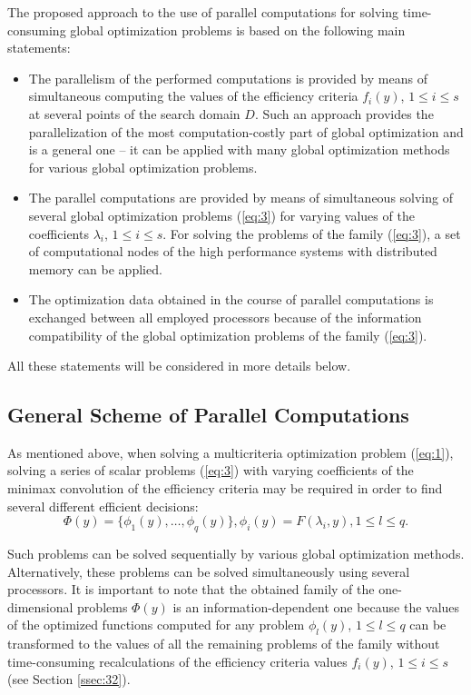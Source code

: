 \documentclass[runningheads]{llncs}
\begin{document}
The proposed approach to the use of parallel computations for solving time-consuming global optimization problems is based on the following main statements:
\begin{itemize}

\item The parallelism of the performed computations is provided by means of simultaneous computing the values of the efficiency criteria $f_i (y)$, $1 \leq i \leq s$ at several points of the search domain $D$. Such an approach provides the parallelization of the most computation-costly part of global optimization and is a general one -- it can be applied with many global optimization methods for various global optimization problems.

\item The parallel computations are provided by means of simultaneous solving of several global optimization problems (\ref{eq:3}) for varying values of the coefficients $\lambda_i$, $1 \leq i \leq s$. For solving the problems of the family (\ref{eq:3}), a set of computational nodes of the high performance systems with distributed memory can be applied.

\item The optimization data obtained in the course of parallel computations is exchanged between all employed processors because of the information compatibility of the global optimization problems of the family (\ref{eq:3}).
\end{itemize}

All these statements will be considered in more details below.


\subsection{General Scheme of Parallel Computations }
\label{ssec:31}

As mentioned above, when solving a multicriteria optimization problem (\ref{eq:1}), solving a series of scalar problems (\ref{eq:3}) with varying coefficients of the minimax convolution of the efficiency criteria may be required in order to find several different efficient decisions:
\begin{equation}
\Phi(y)=\{\phi_1 (y),\dots,\phi_q(y) \}, \phi_i(y)=F(\lambda_i,y), 1 \leq l \leq q.
\label{eq:5}
\end{equation}

Such problems can be solved sequentially by various global optimization methods. Alternatively, these problems can be solved simultaneously using several processors. It is important to note that the obtained family of the one-dimensional problems $\Phi(y)$ is an information-dependent one because the values of the optimized functions computed for any problem $\phi_l (y)$, $1 \leq l \leq q$ can be transformed to the values of all the remaining problems of the family without time-consuming recalculations of the efficiency criteria values $f_i (y)$, $1 \leq i \leq s$ (see Section \ref{ssec:32}).
\end{document}

